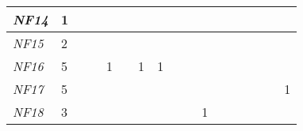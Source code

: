 \begin{table}[]
{\begin{tabular}{|l|l|l|l|l|l|l|l|l|l|l|l|l|l|l|l|l|}
\textit{NF14} & 1                                                     &                                                       &    &                                                       &    &                                                       &                                                       &    &    &                                                       &    &                                                  &                                                  &    &    &    \\ \hline
\textit{NF15} & 2                                                     &                                                       &    &                                                       &    &                                                       &                                                       &    &    &                                                       &    &                                                  &                                                  &    &    &    \\ \hline
\textit{NF16} & 5                                                     &                                                       &    & 1                                                     &    & 1                                                     & 1                                                     &    &    &                                                       &    &                                                  &                                                  &    &    &    \\ \hline
\textit{NF17} & 5                                                     &                                                       &    &                                                       &    &                                                       &                                                       &    &    &                                                       &    &                                                  &                                                  &    &    & 1  \\ \hline
\textit{NF18} & 3                                                     &                                                       &    &                                                       &    &                                                       &                                                       &    &    & 1                                                     &    &                                                  &                                                  &    &    &    \\ \hline

\end{tabular}}
\end{table}
